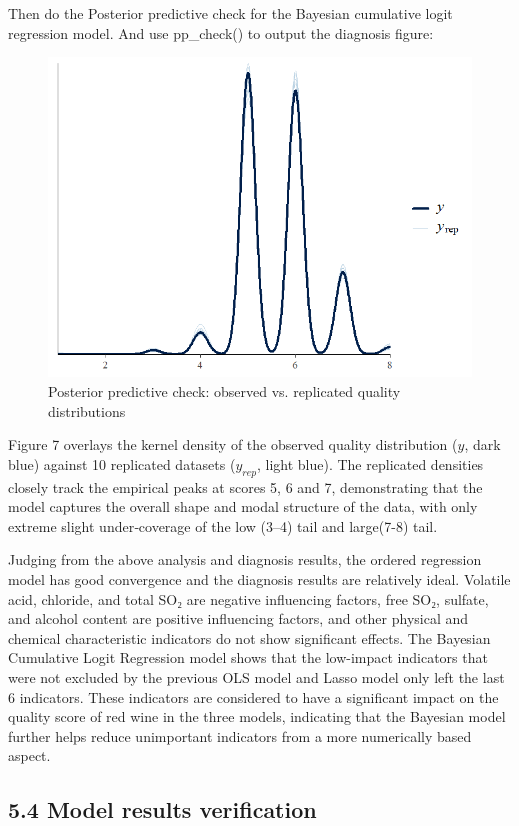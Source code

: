\documentclass[
  doc,floatsintext]{apa6}
\begin{document}
Then do the Posterior predictive check for the Bayesian cumulative logit regression model. And use pp\_check() to output the diagnosis figure:

\begin{figure}[H]

{\centering \includegraphics[width=0.6\linewidth]{../plots/kde} 

}

\caption{Posterior predictive check: observed vs. replicated quality distributions}\label{fig:ppck}
\end{figure}

Figure 7 overlays the kernel density of the observed quality distribution (\(y\), dark blue) against 10 replicated datasets (\(y_{rep}\), light blue). The replicated densities closely track the empirical peaks at scores 5, 6 and 7, demonstrating that the model captures the overall shape and modal structure of the data, with only extreme slight under‐coverage of the low (3--4) tail and large(7-8) tail.

Judging from the above analysis and diagnosis results, the ordered regression model has good convergence and the diagnosis results are relatively ideal. Volatile acid, chloride, and total SO₂ are negative influencing factors, free SO₂, sulfate, and alcohol content are positive influencing factors, and other physical and chemical characteristic indicators do not show significant effects. The Bayesian Cumulative Logit Regression model shows that the low-impact indicators that were not excluded by the previous OLS model and Lasso model only left the last 6 indicators. These indicators are considered to have a significant impact on the quality score of red wine in the three models, indicating that the Bayesian model further helps reduce unimportant indicators from a more numerically based aspect.

\subsection{5.4 Model results verification}\label{model-results-verification}
\end{document}

